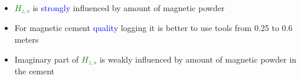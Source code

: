 \documentclass[aspectratio=169]{beamer}
\begin{document}
\begin{frame}
\begin{minipage}{0.49\linewidth}
\end{minipage}
\hfill
\begin{minipage}{0.49\linewidth}
\end{minipage}


\begin{small}
\begin{itemize}
\item \textcolor{green}{$H_{z,s}$} is \textcolor{blue}{strongly} influenced by amount of magnetic powder
\item For magnetic cement \textcolor{blue}{quality} logging it is better to use tools from 0.25 to 0.6 meters
\item Imaginary part of \textcolor{green}{$H_{z,s}$} is weakly influenced by amount of magnetic powder in the cement 
\end{itemize}
\end{small}


\end{frame}
\end{document}
